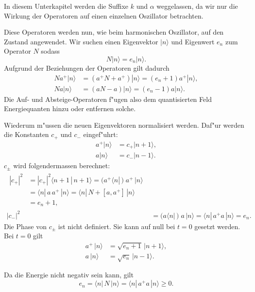 \begin{refsection}
In diesem Unterkapitel werden die Suffixe $k$ und $\alpha$ weggelassen, da wir nur die Wirkung der Operatoren auf einen einzelnen Oszillator betrachten. 

Diese Operatoren werden nun, wie beim harmonischen Oszillator, auf den Zustand angewendet. Wir suchen einen Eigenvektor $|n\rangle$ und Eigenwert $e_n$ zum Operator $N$ sodass
\begin{equation*}
N|n\rangle = e_n|n\rangle.
\end{equation*}
Aufgrund der Beziehungen der Operatoren gilt dadurch
\begin{align*}
Na^+|n\rangle &= (a^+N + a^+)|n\rangle = (e_n + 1)a^+|n\rangle, \\
Na|n\rangle &= (aN - a)|n\rangle = (e_n - 1)a|n\rangle.
\end{align*}
Die Auf- und Absteige-Operatoren f"ugen also dem quantisierten Feld Energiequanten hinzu oder entfernen solche.

Wiederum m"ussen die neuen Eigenvektoren normalisiert werden. Daf"ur werden die Konstanten $c_+$ und $c_-$ eingef"uhrt:
\begin{align*}
a^+|n\rangle &= c_+|n+1\rangle, \\
a|n\rangle &= c_-|n-1\rangle.
\end{align*}
$c_\pm$ wird folgendermassen berechnet:
\begin{align*}
\begin{split}
	|c_+|^2 &= |c_+|^2 \langle n+1 \, | \, n+1 \rangle = ( a^+ \langle n |\,) \; a^+ \,| n \rangle \\
		&= \langle n |\, a \, a^+ \,|n \rangle = \langle n |\, N + [a,a^+] \,|n \rangle \\
		&= e_n+1,
\end{split}\\
	|c_-|^2 &= 	( a \langle n |\,) \; a \,| n \rangle = \langle n |\, a^+ a \,| n \rangle = e_n.
\end{align*}
Die Phase von $c_{\pm}$ ist nicht definiert. Sie kann auf null bei $t=0$ gesetzt werden. Bei $t=0$ gilt
\begin{align*}
a^+\,|n\rangle &= \sqrt{e_n+1}\,|n+1\rangle, \\
a\,|n\rangle &= \sqrt{e_n}\,|n-1\rangle.
\end{align*}

Da die Energie nicht negativ sein kann, gilt
\begin{equation*}
e_n = \langle n |\, N \,|n \rangle = \langle n |\, a^+a \,|n \rangle \geq 0.
\end{equation*}


\end{refsection}
